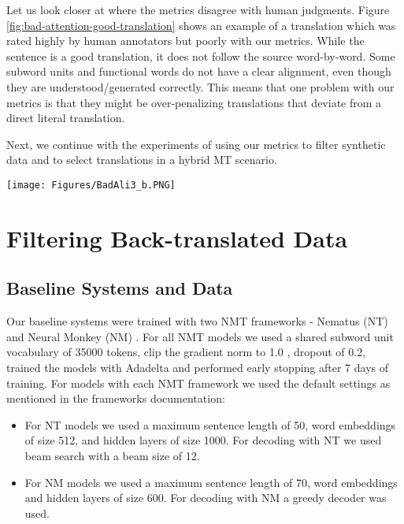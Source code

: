 \documentclass[]{article}
\begin{document}
Let us look closer at where the metrics disagree with human judgments. Figure \ref{fig:bad-attention-good-translation} shows an example of a translation which was rated highly by human annotators but poorly with our metrics. While the sentence is a good translation, it does not follow the source word-by-word. Some subword units and functional words do not have a clear alignment, even though they are understood/generated correctly. This means that one problem with our metrics is that they might be over-penalizing translations that deviate from a direct literal translation.

Next, we continue with the experiments of using our metrics to filter synthetic data and to select translations in a hybrid MT scenario.

\begin{figure*}[h]
  \texttt{[image: Figures/BadAli3\_b.PNG]}
  \caption{Attention alignment visualization of a bad translation. Reference translation: \emph{a 28-year-old chef who had recently moved to San Francisco was found dead in the stairwell of a local mall this week .}, hypothesis translation: \emph{a 28-year-old old man who has recently moved to San Francisco has died this week .}, , , , .}
  \label{fig:bad-attention-good-translation}
\end{figure*}

\FloatBarrier

\section{Filtering Back-translated Data}
\label{sctFiltering}
\subsection{Baseline Systems and Data}

Our baseline systems were trained with two NMT frameworks - Nematus (NT) \citep{sennrich2017nematus} and Neural Monkey (NM) \citep{helcl2017neural}. 
For all NMT models we used a shared subword unit vocabulary \citep{SennrichBPE2016} of 35000 tokens, clip the gradient norm to 1.0 \citep{pascanu2013difficulty}, dropout of 0.2, trained the models with Adadelta \citep{zeiler2012adadelta} and performed early stopping after 7 days of training. For models with each NMT framework we used the default settings as mentioned in the frameworks documentation:

\begin{itemize}
\item For NT models we used a maximum sentence length of 50, word embeddings of size 512, and hidden layers of size 1000. For decoding with NT we used beam search with a beam size of 12.

\item For NM models we used a maximum sentence length of 70, word embeddings and hidden layers of size 600. For decoding with NM a greedy decoder was used.
\end{itemize}
\end{document}
